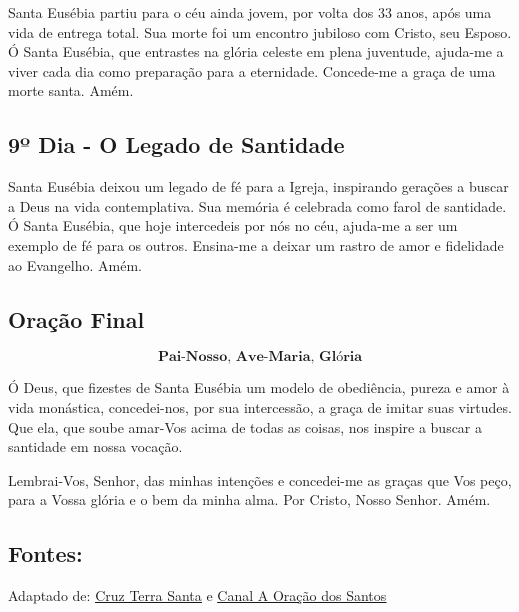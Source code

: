 \documentclass[a4paper,14pt]{extarticle} \usepackage[utf8]{inputenc}
\begin{document}
\underline{}

Santa Eusébia partiu para o céu ainda jovem, por volta dos 33 anos, após uma vida de entrega total. Sua morte foi um encontro jubiloso com Cristo, seu Esposo.
Ó Santa Eusébia, que entrastes na glória celeste em plena juventude, ajuda-me a viver cada dia como preparação para a eternidade. Concede-me a graça de uma morte santa. Amém.


\underline{}

\subsection{9º Dia - O Legado de Santidade}

\underline{}

Santa Eusébia deixou um legado de fé para a Igreja, inspirando gerações a buscar a Deus na vida contemplativa. Sua memória é celebrada como farol de santidade.
Ó Santa Eusébia, que hoje intercedeis por nós no céu, ajuda-me a ser um exemplo de fé para os outros. Ensina-me a deixar um rastro de amor e fidelidade ao Evangelho. Amém.


\underline{}

\subsection{Oração Final}\label{sub:final} %

\[\textbf{Pai-Nosso, Ave-Maria, Glória}\]

Ó Deus, que fizestes de Santa Eusébia um modelo de obediência, pureza e amor à vida monástica, concedei-nos, por sua intercessão, a graça de imitar suas virtudes. Que ela, que soube amar-Vos acima de todas as coisas, nos inspire a buscar a santidade em nossa vocação.

Lembrai-Vos, Senhor, das minhas intenções e concedei-me as graças que Vos peço, para a Vossa glória e o bem da minha alma. Por Cristo, Nosso Senhor. Amém.


\vfill

\begin{center}
\subsection*{Fontes:}
Adaptado de: {\color{blue} \underline{\href{https://cruzterrasanta.com.br/santa-eusebia/615/102/}{Cruz Terra Santa}}} e {\color{blue} \underline{\href{https://www.youtube.com/playlist?list=PLN7jQwkJvdQqZ3TDirRd2ygYI5ns92DhF}{Canal A Oração dos Santos}}}
\end{center}
\end{document}
